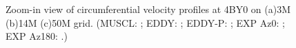 \begin{figure}[t]
     \caption{Zoom-in view of circumferential velocity profiles at 4BY0 on (a)3M (b)14M (c)50M grid. (MUSCL: \mline; EDDY: \eline; EDDY-P: \epline; EXP Az0: \bluecrx; EXP Az180: \redcrx.)}
     \label{zv} 
\end{figure}
